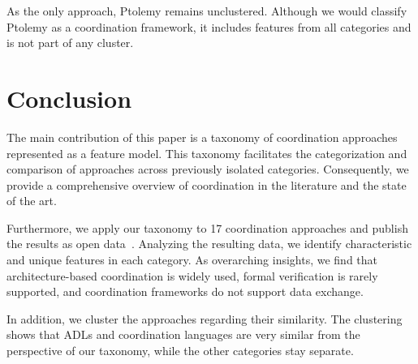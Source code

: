 \documentclass[runningheads]{llncs}
\begin{document}
As the only approach, Ptolemy remains unclustered. 
Although we would classify Ptolemy as a coordination framework, it includes features from all categories and is not part of any cluster.

\section{Conclusion} \label{sec: conclusion}

The main contribution of this paper is a taxonomy of coordination approaches represented as a feature model.
This taxonomy facilitates the categorization and comparison of approaches across previously isolated categories.
Consequently, we provide a comprehensive overview of coordination in the literature and the state of the art.

Furthermore, we apply our taxonomy to 17 coordination approaches and publish the results as open data~\cite{timkrauterArtifactsCoordination2024}.
Analyzing the resulting data, we identify characteristic and unique features in each category.
As overarching insights, we find that architecture-based coordination is widely used, formal verification is rarely supported, and coordination frameworks do not support data exchange.

In addition, we cluster the approaches regarding their similarity.
The clustering shows that ADLs and coordination languages are very similar from the perspective of our taxonomy, while the other categories stay separate.



\end{document}
